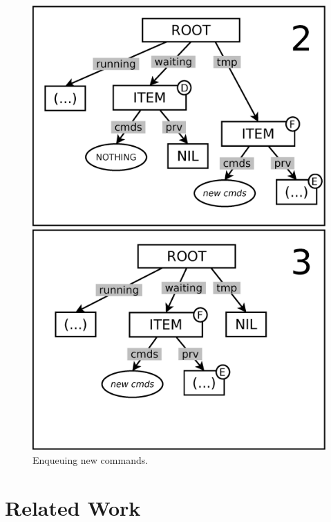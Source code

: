 \documentclass{sig-alternate}
\begin{document}
\begin{figure}[t]
\begin{minipage}[t]{0.99\linewidth}
\centering
\includegraphics[scale=0.23]{queue-22.eps}
\end{minipage}

\begin{minipage}[t]{0.99\linewidth}
\centering
\includegraphics[scale=0.23]{queue-23.eps}
\end{minipage}
\caption{
Enqueuing new commands.
\label{fig.queue-2}
}
\end{figure}

\section{Related Work}
\end{document}
